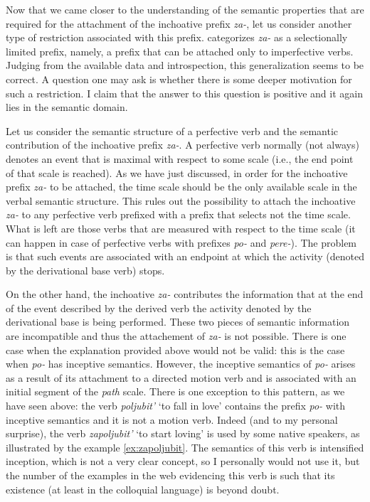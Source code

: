 Now that we came closer to the understanding of the semantic properties that are required for the attachment of the inchoative prefix \textit{za-}, let us consider another type of restriction associated with this prefix. \citet{Tatevosov:09} categorizes \textit{za-} as a selectionally limited prefix, namely, a prefix that can be attached only to imperfective verbs. Judging from the available data and introspection, this generalization seems to be correct. A question one may ask is whether there is some deeper motivation for such a restriction. I claim that the answer to this question is positive and it again lies in the semantic domain. 

Let us consider the semantic structure of a perfective verb and the semantic contribution of the inchoative prefix \textit{za-}. A perfective verb normally (not always) denotes an event that is maximal with respect to some scale (i.e., the end point of that scale is reached). As we have just discussed, in order for the inchoative prefix \textit{za-} to be attached, the time scale should be the only available scale in the verbal semantic structure. This rules out the possibility to attach the inchoative \textit{za-} to any perfective verb prefixed with a prefix that selects not the time scale. What is left are those verbs that are measured with respect to the time scale (it can happen in case of perfective verbs with prefixes \textit{po-} and \textit{pere-}). The problem is that such events are associated with an endpoint at which the activity (denoted by the derivational base verb) stops. 

On the other hand, the inchoative \textit{za-} contributes the information that at the end of the event described by the derived verb the activity denoted by the derivational base is being performed. These two pieces of semantic information are incompatible and thus the attachement of \textit{za-} is not possible. There is one case when the explanation provided above would not be valid: this is the case when \textit{po-} has inceptive semantics. However, the inceptive semantics of \textit{po-} arises as a result of its attachment to a directed motion verb and is associated with an initial segment of the \textit{path} scale. There is one exception to this pattern, as we have seen above: the verb \textit{poljubit'} `to fall in love' contains the prefix \textit{po-} with inceptive semantics and it is not a motion verb. Indeed (and to my personal surprise), the verb \textit{zapoljubit'} `to start loving' is used by some native speakers, as illustrated by the example \ref{ex:zapoljubit}. The semantics of this verb is intensified inception, which is not a very clear concept, so I personally would not use it, but the number of the examples in the web evidencing this verb is such that its existence (at least in the colloquial language) is beyond doubt.

